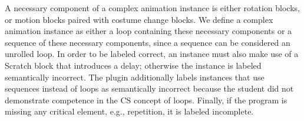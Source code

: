 A necessary component of a complex animation instance is either rotation
blocks, or motion blocks paired with costume change blocks. We define a complex
animation instance as either a loop containing these necessary components or a
sequence of these necessary components, since a sequence can be considered an
unrolled loop. In order to be labeled correct, an instance must also make use
of a Scratch block that introduces a delay; otherwise the instance is labeled
semantically incorrect. The plugin additionally labels instances that use
sequences instead of loops as semantically incorrect because the student did
not demonstrate competence in the CS concept of loops. Finally, if the program
is missing any critical element, e.g., repetition, it is labeled incomplete.
